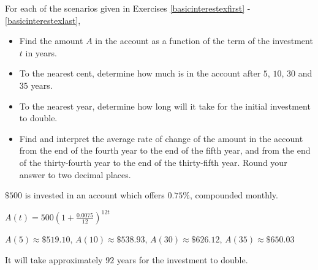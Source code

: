 \documentclass{ximera}
\begin{document}
	\author{Stitz-Zeager}



\label{ExercisesforApplicationsofExponentialandLogarithmicFunctions}

\begin{question}
    
For each of the scenarios given in Exercises \ref{basicinterestexfirst} - \ref{basicinterestexlast}, 

\begin{itemize}

\item  Find the amount $A$ in the account as a function of the term of the investment $t$ in years. 

\item  To the nearest cent, determine how much is in the account after $5$, $10$, $30$ and $35$ years.  

\item  To the nearest year, determine how long will it take for the initial investment to double.  

\item  Find and interpret the average rate of change of the amount in the account from the end of
the fourth year to the end of the fifth year, and from the end of the thirty-fourth year to the
end of the thirty-fifth year.  Round your answer to two decimal places.

\end{itemize} 

\begin{problem} \label{basicinterestexfirst}
    $\$500$ is invested in an account which offers $0.75 \%$, compounded monthly. 

\begin{solution}
    $A(t) = 500\left(1 + \frac{0.0075}{12}\right)^{12t}$ 
\end{solution}

\begin{solution}
    $A(5) \approx \$ 519.10$, $A(10) \approx \$ 538.93$, $A(30) \approx \$ 626.12$, $A(35) \approx \$ 650.03$ 
\end{solution}

\begin{solution}
    It will take approximately $92$ years for the investment to double.
\end{solution}


\end{problem}
\end{question}
\end{document}
